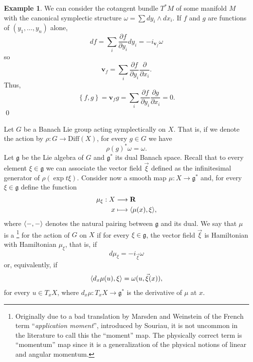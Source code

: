 \documentclass[12pt,a4paper]{book}
\theoremstyle{definition} \newtheorem{defn}[thm]{Definition}
\theoremstyle{definition} \newtheorem{ejemplo}[thm]{Example}
\theoremstyle{remark} \newtheorem{rem}[thm]{Remark}
\def\gg{\mathfrak{g}}
\def\RR{\mathbf{R}}
\newcommand{\ve}[1]{\mathbf{#1}}
\let\emph\relax
\DeclarePairedDelimiter\esc{\langle}{\rangle}
\begin{document}
\begin{ejemplo}
  We can consider the cotangent bundle $T^*M$ of some manifold $M$ with the canonical symplectic structure $\omega=\sum dy_i \wedge dx_i$. If $f$ and $g$ are functions of $(y_1,\dots,y_n)$ alone,
  \begin{equation*}
    df=\sum_i \frac{\partial f}{\partial y_i} dy_i =- i_{\ve{v}_f}\omega
  \end{equation*}
  so
  \begin{equation*}
    \ve{v}_f=\sum_i \frac{\partial f}{\partial y_i}\frac{\partial}{\partial x_i}.
  \end{equation*}
  Thus, 
  \begin{equation*}
    \left\{ f,g \right\}=\ve{v}_f g=\sum_{i} \frac{\partial f}{\partial y_i}\frac{\partial g}{\partial x_i}=0.
  \end{equation*}
  \qed
\end{ejemplo}

Let $G$ be a Banach Lie group acting symplectically on $X$. That is, if we denote the action by $\rho:G\rightarrow \mathrm{Diff}(X)$, for every $g\in G$ we have
\begin{equation*}
  \rho(g)^*\omega=\omega.
\end{equation*}
Let $\gg$ be the Lie algebra of $G$ and $\gg^*$ its dual Banach space. Recall that to every element $\xi \in \gg$ we can associate the vector field $\vec{\xi}$ defined as the infinitesimal generator of $\rho(\exp{t\xi})$. Consider now a smooth map $\mu:X\rightarrow \gg^*$ and, for every $\xi \in \gg$ define the function
\begin{align*}
  \mu_\xi :X&\longrightarrow \RR\\ 
  x &\longmapsto \esc{\mu(x),\xi}, 
  \end{align*}
  where $\esc{-,-}$ denotes the natural pairing between $\gg$ and its dual. We say that $\mu$ is a \emph{momentum map}\footnote{Originally due to a bad translation by Marsden and Weinstein of the French term ``\textit{application moment}'', introduced by Souriau, it is not uncommon in the literature to call this the ``moment'' map. The physically correct term is ``momentum'' map since it is a generalization of the physical notions of linear and angular momentum.} for the action of $G$ on $X$ if for every $\xi\in \gg$, the vector field $\vec{\xi}$ is Hamiltonian with Hamiltonian $\mu_\xi$, that is, if
  \begin{equation*}
    d\mu_\xi=-i_{\vec{\xi}}\omega
  \end{equation*}
  or, equivalently, if
  \begin{equation*}
    \esc{d_x\mu(u),\xi}=\omega(u,\vec{\xi}(x)),
  \end{equation*}
  for every $u\in T_xX$, where $d_x\mu:T_xX \rightarrow \gg^*$ is the derivative of $\mu$ at $x$.
\end{document}
